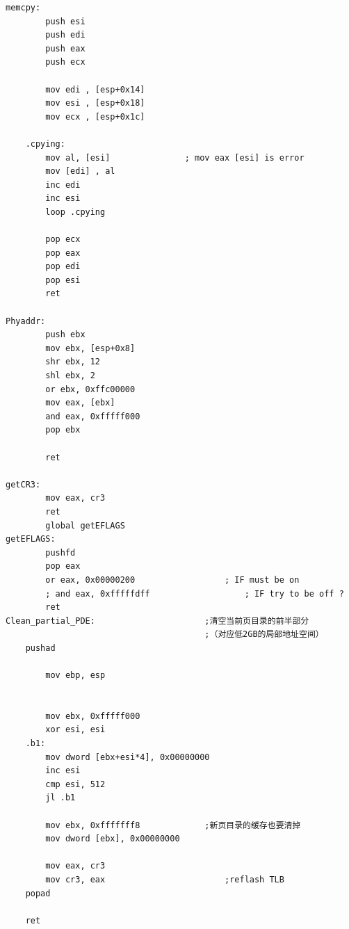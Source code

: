 \documentclass[a4paper,11pt,UTF8]{ctexart}
\begin{document}
	\begin{lstlisting}[language=={[x86masm]Assembler}keywordstyle=\color{blue!70},commentstyle=\color{red!50!green!50!blue!50},frame=shadowbox, rulesepcolor=\color{red!20!green!20!blue!20}]
		memcpy:
		push esi
		push edi
		push eax
		push ecx

		mov edi , [esp+0x14]
		mov esi , [esp+0x18]
		mov ecx , [esp+0x1c]

	.cpying:
		mov al, [esi]				; mov eax [esi] is error
		mov [edi] , al
		inc edi
		inc esi
		loop .cpying

		pop ecx
		pop eax
		pop edi
		pop esi
		ret

Phyaddr:
		push ebx
		mov ebx, [esp+0x8]
		shr ebx, 12
		shl ebx, 2
		or ebx, 0xffc00000
		mov eax, [ebx]
		and eax, 0xfffff000
		pop ebx

		ret 

getCR3:
		mov eax, cr3
		ret 
		global getEFLAGS
getEFLAGS:
		pushfd
		pop eax
		or eax, 0x00000200					; IF must be on 
		; and eax, 0xfffffdff					; IF try to be off ?
		ret 
Clean_partial_PDE:						;清空当前页目录的前半部分
										;（对应低2GB的局部地址空间） 
	pushad

		mov ebp, esp

		 
		mov ebx, 0xfffff000
		xor esi, esi
	.b1:
		mov dword [ebx+esi*4], 0x00000000
		inc esi
		cmp esi, 512
		jl .b1

		mov ebx, 0xfffffff8				;新页目录的缓存也要清掉
		mov dword [ebx], 0x00000000

		mov eax, cr3
		mov cr3, eax						;reflash TLB
	popad

	ret

	\end{lstlisting}
	\begin{lstlisting}[language=={[x86masm]Assembler}keywordstyle=\color{blue!70},commentstyle=\color{red!50!green!50!blue!50},frame=shadowbox, rulesepcolor=\color{red!20!green!20!blue!20}]

	\end{lstlisting}
	
\end{document}
